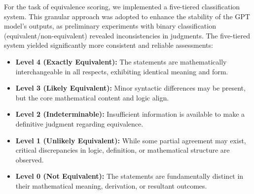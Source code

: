 \documentclass[11pt]{article}
\begin{document}
For the task of equivalence scoring, we implemented a five-tiered classification system. This granular approach was adopted to enhance the stability of the GPT model's outputs, as preliminary experiments with binary classification (equivalent/non-equivalent) revealed inconsistencies in judgments. The five-tiered system yielded significantly more consistent and reliable assessments:
\begin{itemize}
\item \textbf{Level 4 (Exactly Equivalent):} The statements are mathematically interchangeable in all respects, exhibiting identical meaning and form.
\item \textbf{Level 3 (Likely Equivalent):} Minor syntactic differences may be present, but the core mathematical content and logic align.
\item \textbf{Level 2 (Indeterminable):} Insufficient information is available to make a definitive judgment regarding equivalence.
\item \textbf{Level 1 (Unlikely Equivalent):} While some partial agreement may exist, critical discrepancies in logic, definition, or mathematical structure are observed.
\item \textbf{Level 0 (Not Equivalent):} The statements are fundamentally distinct in their mathematical meaning, derivation, or resultant outcomes.
\end{itemize}
\end{document}
